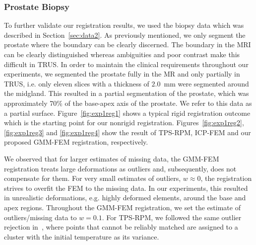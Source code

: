 \documentclass[journal]{IEEEtran}
\begin{document}
\subsubsection{Prostate Biopsy}
To further validate our registration results, we used the biopsy data which was described in Section~\ref{sec:data2}. As previously mentioned, we only segment the prostate where the boundary can be clearly discerned. The boundary in the MRI can be clearly distinguished whereas ambiguities and poor contrast make this difficult in TRUS. In order to maintain the clinical requirements throughout our experiments, we segmented the prostate fully in the MR and only partially in TRUS, i.e. only eleven slices with a thickness of $2.0$~mm were segmented around the midgland. This resulted in a partial segmentation of the prostate, which was approximately 70\% of the base-apex axis of the prostate.  We refer to this data as a partial surface. Figure~\ref{fig:exp1reg1} shows a typical rigid registration outcome which is the starting point for our nonrigid registration. Figures~\ref{fig:exp1reg2}, \ref{fig:exp1reg3} and \ref{fig:exp1reg4} show the result of TPS-RPM, ICP-FEM and our proposed GMM-FEM registration, respectively.

We observed that for larger estimates of missing data, the GMM-FEM registration treats large deformations as outliers and, subsequently, does not compensate for them. For very small estimates of outliers, $w\approx0$, the registration strives to overfit the FEM to the missing data. In our experiments, this resulted in unrealistic deformations, e.g. highly deformed elements, around the base and apex regions. Throughout the GMM-FEM registration, we set the estimate of outliers/missing data to $w=0.1$. For TPS-RPM, we followed the same outlier rejection in~\cite{Chui03a}, where points that cannot be reliably matched are assigned to a cluster with the initial temperature as its variance.
\end{document}
